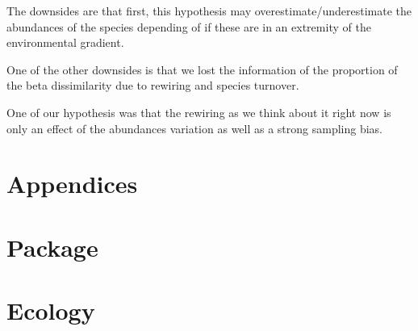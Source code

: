\documentclass{article}
\begin{document}
The downsides are that first, this hypothesis may overestimate/underestimate the abundances of the species depending of if these are in an extremity of the environmental gradient.

One of the other downsides is that we lost the information of the proportion of the beta dissimilarity due to rewiring and species turnover. 

One of our hypothesis was that the rewiring as we think about it right now is only an effect of the abundances variation as well as a strong sampling bias.





\section{Appendices}



\section{Package}



\section{Ecology}
\end{document}
